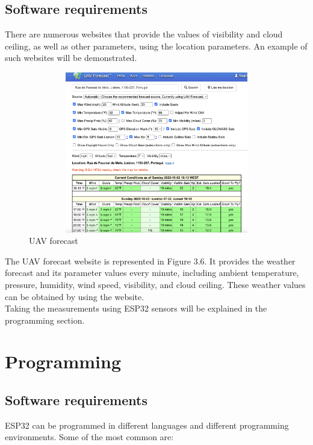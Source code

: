 \documentclass{report}
\begin{document}
\subsection{Software requirements}
There are numerous websites that provide the values of visibility and cloud ceiling, as well as other parameters, using the location parameters. An example of such websites will be demonstrated.
\newpage
\begin{figure}[h!]
  \centering
    \includegraphics[width=12cm, height=7cm] {website.png}
    \caption{UAV forecast\cite{uav}}
    \label{fig:my_label}
\end{figure}
\hfill \break 
The UAV forecast website is represented in Figure 3.6. It provides the weather forecast and its parameter values every minute, including ambient temperature, pressure, humidity, wind speed, visibility, and cloud ceiling. These weather values can be obtained by using the website.
\hfill \break \\
Taking the measurements using ESP32 sensors will be explained in the programming section.

\section{Programming}
\subsection{Software requirements}
ESP32 can be programmed in different languages and different programming environments. Some of the most common are:
\end{document}
